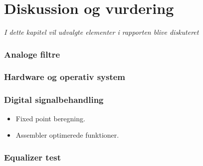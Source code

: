 
\chapter{Diskussion og vurdering}\label{kap:diskussion}
\emph{I dette kapitel vil udvalgte elementer i rapporten blive diskuteret}

\subsection{Analoge filtre}

\subsection{Hardware og operativ system}

\subsection{Digital signalbehandling}

\begin{itemize}
\item Fixed point beregning.
\item Assembler optimerede funktioner.
\end{itemize}
\subsection{Equalizer test}
